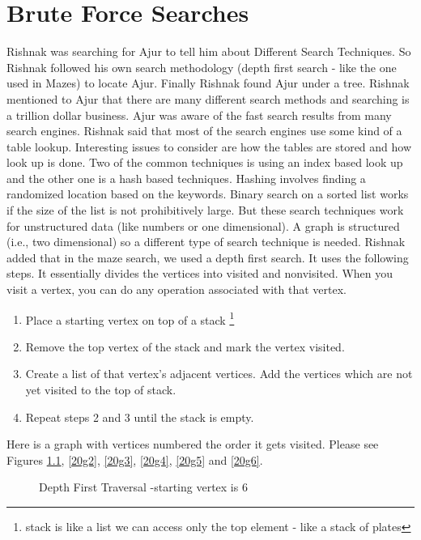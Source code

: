 \chapter{Brute Force Searches}

Rishnak was searching for Ajur to tell him about Different Search Techniques. So Rishnak followed his own search methodology (depth first search - like the one used in Mazes) to locate Ajur. Finally Rishnak found Ajur under a tree. Rishnak mentioned to Ajur that there are many different search methods and searching is a trillion dollar business. Ajur was aware of the fast search results from many search engines. Rishnak said that most of the search engines use some kind of a table lookup. Interesting issues to consider are how the tables are stored and how look up is done. Two of the common techniques is using an index based look up and the other one is a hash based techniques. Hashing involves finding a randomized location based on the keywords.  Binary search on a sorted list works if the size of the list is not prohibitively large. But these search techniques work for unstructured data (like numbers or one dimensional). A graph is structured (i.e., two dimensional) so a different type of search technique is needed.
Rishnak added that in the maze search, we used a depth first search. It uses the following steps. It essentially divides the vertices into visited and nonvisited. When you visit a vertex, you can do any
operation associated with that vertex.

\begin{enumerate}
    \item Place a starting vertex on top of a stack \footnote{stack is like a list we can access only the top element - like a stack of plates}
     \item Remove the top vertex of the stack and mark the vertex visited.
     \item Create a list of that vertex's adjacent vertices. Add the vertices which are not yet visited  to the top of stack.
     \item Repeat steps 2 and 3 until the stack is empty.
\end{enumerate}

Here is a graph with vertices numbered the order it gets visited. Please see Figures \ref{20g1}, \ref{20g2}, \ref{20g3}, \ref{20g4}, \ref{20g5} and \ref{20g6}. 
\begin{figure}
\begin{center}
\caption{ Depth First Traversal -starting vertex is 6}\label{20g1}
\end{center}
\end{figure}

